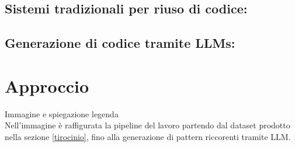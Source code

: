 \documentclass{article}
\begin{document}
\subsection{Sistemi tradizionali per riuso di codice:}



\subsection{Generazione di codice tramite LLMs:}





\section{Approccio}
Immagine e spiegazione legenda\\
Nell'immagine è raffigurata la pipeline del lavoro partendo dal dataset prodotto nella sezione \ref{tirocinio}, fino alla generazione di pattern riccorenti tramite LLM.
\end{document}
